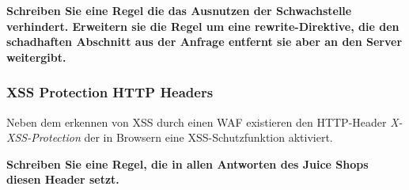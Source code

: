 \textbf{Schreiben Sie eine Regel die das Ausnutzen der Schwachstelle verhindert.
Erweitern sie die Regel um eine rewrite-Direktive, die den schadhaften Abschnitt aus der Anfrage entfernt sie aber an den Server weitergibt.}

\subsubsection{XSS Protection HTTP Headers}

Neben dem erkennen von XSS durch einen WAF existieren den HTTP-Header \textit{X-XSS-Protection} der in Browsern eine XSS-Schutzfunktion aktiviert.

\textbf{Schreiben Sie eine Regel, die in allen Antworten des Juice Shops diesen Header setzt.}

\pagebreak